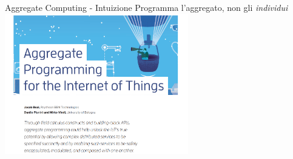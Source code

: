 \documentclass[presentation, 10pt,aspectratio=169]{beamer}\mode<presentation>{\usetheme{AMSBolognaFC}}
\begin{document}
\begin{frame}{Aggregate Computing - Intuizione}
	\centering
	\Large Programma l'\alert{aggregato}, non gli \emph{individui}
	\includegraphics[width=0.6\textwidth]{img/overview.png}
\end{frame}
\end{document}
